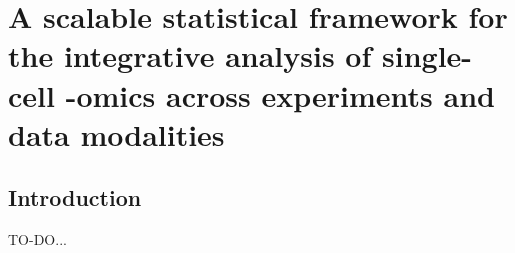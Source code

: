 \chapter{A scalable statistical framework for the integrative analysis of single-cell -omics across experiments and data modalities}

\section{Introduction}
TO-DO...

